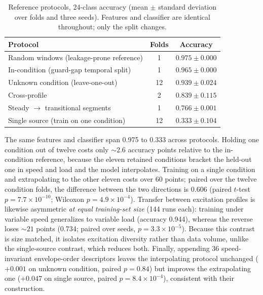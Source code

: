 \documentclass[journal]{IEEEtran}
\begin{document}
\begin{table}[!t]
\caption{Reference protocols, 24-class accuracy (mean $\pm$ standard deviation
over folds and three seeds). Features and classifier are identical
throughout; only the split changes.}
\label{tab:condref}
\centering
\footnotesize
\setlength{\tabcolsep}{5pt}
\begin{tabular}{l c c}
\toprule
Protocol & Folds & Accuracy \\
\midrule
Random windows (leakage-prone reference)   & 1  & $0.975 \pm 0.000$ \\
In-condition (guard-gap temporal split)    & 1  & $0.965 \pm 0.000$ \\
Unknown condition (leave-one-out)          & 12 & $0.939 \pm 0.024$ \\
Cross-profile                              & 2  & $0.839 \pm 0.115$ \\
Steady $\rightarrow$ transitional segments & 1  & $0.766 \pm 0.001$ \\
Single source (train on one condition)     & 12 & $0.333 \pm 0.104$ \\
\bottomrule
\end{tabular}
\end{table}

The same features and classifier span 0.975 to 0.333 across protocols.
Holding one condition out of twelve costs only ${\sim}2.6$ accuracy points
relative to the in-condition reference, because the eleven retained
conditions bracket the held-out one in speed and load and the model
interpolates. Training on a single condition and extrapolating to the other
eleven costs over 60 points; paired over the twelve condition folds, the
difference between the two directions is 0.606 (paired $t$-test
$p = 7.7\times10^{-10}$; Wilcoxon $p = 4.9\times10^{-4}$). Transfer between
excitation profiles is likewise asymmetric \emph{at equal training-set size}
(144 runs each): training under variable speed generalizes to variable load
(accuracy 0.944), whereas the reverse loses ${\sim}21$ points (0.734; paired
over seeds, $p = 3.3\times10^{-5}$). Because this contrast is size matched, it
isolates excitation diversity rather than data volume, unlike the
single-source contrast, which reduces both. Finally, appending 36
speed-invariant envelope-order descriptors leaves the interpolating protocol
unchanged ($+0.001$ on unknown condition, paired $p = 0.84$) but improves the
extrapolating one ($+0.047$ on single source, paired
$p = 8.4\times10^{-4}$), consistent with their construction.
\end{document}
